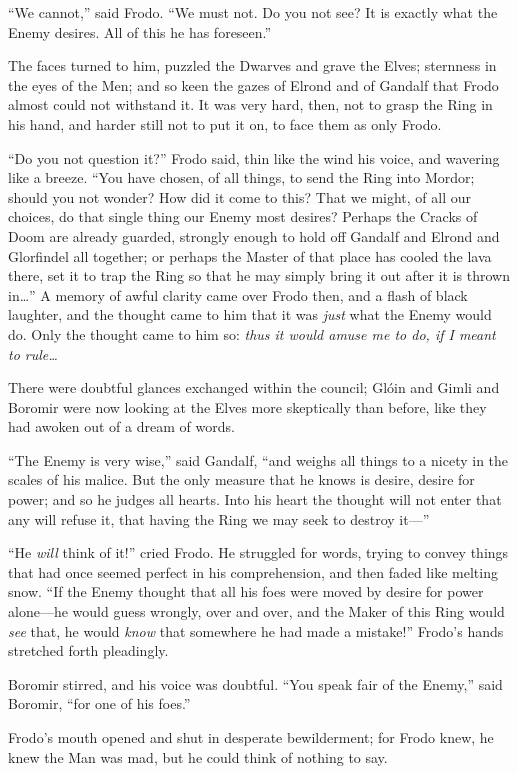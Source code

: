 “We cannot,” said Frodo. “We must not. Do you not see? It is exactly what the Enemy desires. All of this he has foreseen.”

The faces turned to him, puzzled the Dwarves and grave the Elves; sternness in the eyes of the Men; and so keen the gazes of Elrond and of Gandalf that Frodo almost could not withstand it. It was very hard, then, not to grasp the Ring in his hand, and harder still not to put it on, to face them as only Frodo.

“Do you not question it?” Frodo said, thin like the wind his voice, and wavering like a breeze. “You have chosen, of all things, to send the Ring into Mordor; should you not wonder? How did it come to this? That we might, of all our choices, do that single thing our Enemy most desires? Perhaps the Cracks of Doom are already guarded, strongly enough to hold off Gandalf and Elrond and Glorfindel all together; or perhaps the Master of that place has cooled the lava there, set it to trap the Ring so that he may simply bring it out after it is thrown in…” A memory of awful clarity came over Frodo then, and a flash of black laughter, and the thought came to him that it was \emph{just} what the Enemy would do. Only the thought came to him so: \emph{thus it would amuse me to do, if I meant to rule…}

There were doubtful glances exchanged within the council; Glóin and Gimli and Boromir were now looking at the Elves more skeptically than before, like they had awoken out of a dream of words.

“The Enemy is very wise,” said Gandalf, “and weighs all things to a nicety in the scales of his malice. But the only measure that he knows is desire, desire for power; and so he judges all hearts. Into his heart the thought will not enter that any will refuse it, that having the Ring we may seek to destroy it—”

“He \emph{will} think of it!” cried Frodo. He struggled for words, trying to convey things that had once seemed perfect in his comprehension, and then faded like melting snow. “If the Enemy thought that all his foes were moved by desire for power alone—he would guess wrongly, over and over, and the Maker of this Ring would \emph{see} that, he would \emph{know} that somewhere he had made a mistake!” Frodo’s hands stretched forth pleadingly.

Boromir stirred, and his voice was doubtful. “You speak fair of the Enemy,” said Boromir, “for one of his foes.”

Frodo’s mouth opened and shut in desperate bewilderment; for Frodo knew, he knew the Man was mad, but he could think of nothing to say.

